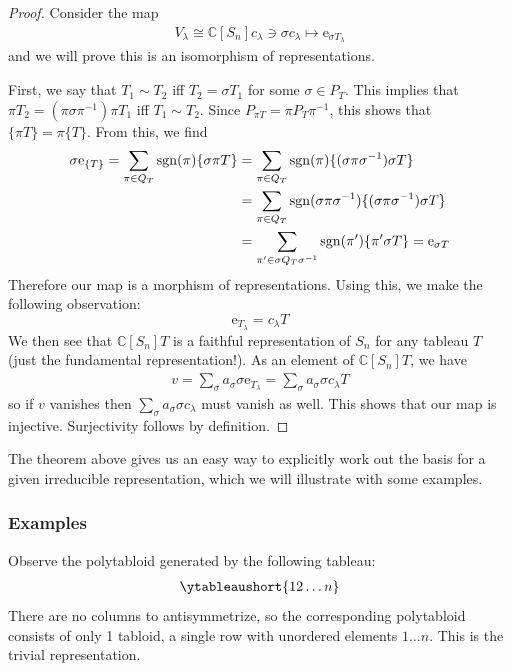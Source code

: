 \documentclass[11pt]{article}
\theoremstyle{definition}
\newcommand{\C}{\mathbb C}
\newcommand{\sgn}{\operatorname{sgn}}
\newcommand{\e}{\mathrm{e}}
\begin{document}
\begin{proof}
Consider the map
\begin{align}
  V_\lambda \cong \C[S_n]c_\lambda \ni \sigma c_{\lambda} \mapsto \e_{\sigma T_{\lambda}}
\end{align}
and we will prove this is an isomorphism of representations.

First, we say that $T_1 \sim T_2$ iff $T_2 = \sigma T_1$ for some $\sigma \in P_T$.
This implies that $\pi T_2 = (\pi \sigma \pi^{-1})\pi T_1$ iff $T_1 \sim T_2$.
Since $P_{\pi T} = \pi P_T\pi^{-1}$, this shows that $\{\pi T\} =  \pi\{T\}$. From this, we find
\begin{align}
  \sigma \e_{\{T\}} =  \sum_{\pi \in Q_T}\sgn(\pi)\{ \sigma\pi T\} &=
                                                                      \sum_{\pi \in Q_T}\sgn(\pi)\{(\sigma \pi\sigma^{-1}) \sigma T\}  \notag \\
  &=
    \sum_{\pi \in Q_T}\sgn(\sigma\pi\sigma^{-1})\{(\sigma \pi\sigma^{-1}) \sigma T\} \notag \\
  &=
  \sum_{\pi' \in \sigma Q_T\sigma^{-1}}\sgn(\pi')\{\pi' \sigma T\} = \e_{\sigma T}
\end{align}
Therefore our map is a morphism of representations. Using this, we make the
following observation:
\begin{equation}
  \e_{T_\lambda} = c_\lambda T
\end{equation}
We then see that $\C[S_n]T$ is a faithful representation of
$S_n$ for any tableau $T$ (just the fundamental representation!). As an element of $\C[S_n]T$, we have
\begin{align}
v = \sum_{\sigma} a_\sigma \sigma \e_{T_\lambda} = \sum_{\sigma}a_{\sigma}\sigma c_{\lambda}T
\end{align}
so if $v$ vanishes then $\sum_{\sigma}a_{\sigma}\sigma c_{\lambda}$ must vanish
as well. This shows that our map is injective. Surjectivity follows by definition.
\end{proof}

The theorem above gives us an easy way to explicitly work out the basis for
a given irreducible representation, which we will illustrate with some examples.

\subsubsection{Examples}
Observe the polytabloid generated by the following tableau:
\begin{align}
\ytableaushort{12 \dots n}
\end{align}
There are no columns to antisymmetrize, so the corresponding polytabloid
consists of only 1 tabloid, a single row with unordered elements $1 \dots n$.
This is the trivial representation.
\end{document}
